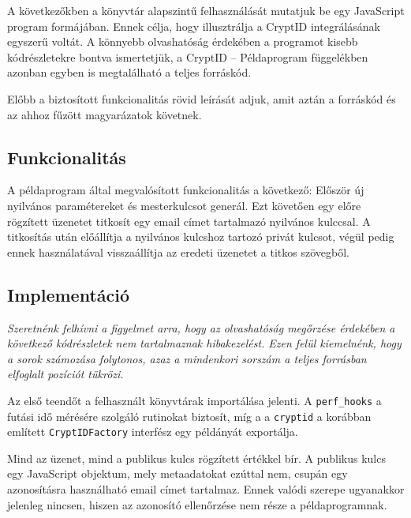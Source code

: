A következőkben a könyvtár alapszintű felhasználását mutatjuk be egy JavaScript program formájában. Ennek célja, hogy illusztrálja a CryptID integrálásának egyszerű voltát. A könnyebb olvashatóság érdekében a programot kisebb kódrészletekre bontva ismertetjük, a CryptID – Példaprogram függelékben
azonban egyben is megtalálható a teljes forráskód.

Előbb a biztosított funkcionalitás rövid leírását adjuk, amit aztán a forráskód és az ahhoz fűzött magyarázatok követnek. 

\subsection{Funkcionalitás}

A példaprogram által megvalósított funkcionalitás a következő: Először új nyilvános paramétereket és mesterkulcsot generál. Ezt követően egy előre rögzített üzenetet titkosít egy email címet tartalmazó nyilvános kulccsal. A titkosítás után előállítja a nyilvános kulcshoz tartozó privát kulcsot, végül pedig ennek használatával visszaállítja az eredeti üzenetet a titkos szövegből.

\subsection{Implementáció}

\textit{Szeretnénk felhívni a figyelmet arra, hogy az olvashatóság megőrzése érdekében a következő kódrészletek nem tartalmaznak hibakezelést. Ezen felül kiemelnénk, hogy a sorok számozása folytonos, azaz a mindenkori sorszám a teljes forrásban elfoglalt pozíciót tükrözi.}



Az első teendőt a felhasznált könyvtárak importálása jelenti. A \texttt{perf\_hooks} a futási idő mérésére szolgáló rutinokat biztosít, míg a a \texttt{cryptid} a korábban említett \texttt{CryptIDFactory} interfész egy példányát exportálja.



Mind az üzenet, mind a publikus kulcs rögzített értékkel bír. A publikus kulcs egy JavaScript objektum, mely metaadatokat ezúttal nem, csupán egy azonosításra használható email címet tartalmaz. Ennek valódi szerepe ugyanakkor jelenleg nincsen, hiszen az azonosító ellenőrzése nem része a példaprogramnak.

